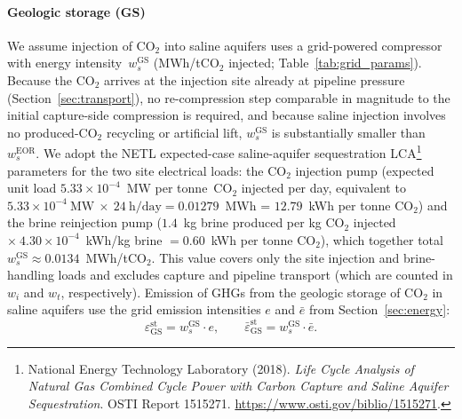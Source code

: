 \documentclass[11pt]{article}
\newcommand{\cotwo}{\ensuremath{\mathrm{CO_2}}}
\begin{document}
\paragraph{Geologic storage (GS)}
We assume injection of \cotwo{} into saline aquifers uses a grid-powered compressor with energy intensity~$w_s^{\text{GS}}$ (MWh/t\cotwo{} injected; Table~\ref{tab:grid_params}). Because the \cotwo{} arrives at the injection site already at pipeline pressure (Section~\ref{sec:transport}), no re-compression step comparable in magnitude to the initial capture-side compression is required, and because saline injection involves no produced-\cotwo{} recycling or artificial lift, $w_s^{\text{GS}}$ is substantially smaller than $w_s^{\text{EOR}}$. We adopt the NETL expected-case saline-aquifer sequestration LCA\footnote{National Energy Technology Laboratory (2018). \emph{Life Cycle Analysis of Natural Gas Combined Cycle Power with Carbon Capture and Saline Aquifer Sequestration}. OSTI Report 1515271. \url{https://www.osti.gov/biblio/1515271}.} parameters for the two site electrical loads: the CO$_2$ injection pump (expected unit load $5.33\times10^{-4}$~MW per tonne~\cotwo{} injected per day, equivalent to $5.33\times10^{-4}~\text{MW}~\times~24~\text{h/day} = 0.01279$~MWh = $12.79$~kWh per tonne \cotwo{}) and the brine reinjection pump ($1.4$~kg brine produced per kg \cotwo{} injected $\times~4.30\times10^{-4}$~kWh/kg brine $= 0.60$~kWh per tonne \cotwo{}), which together total $w_s^{\text{GS}} \approx 0.0134$~MWh/t\cotwo{}. This value covers only the site injection and brine-handling loads and excludes capture and pipeline transport (which are counted in $w_i$ and $w_t$, respectively).
Emission of GHGs from the geologic storage of \cotwo{} in saline aquifers use the grid emission intensities $e$ and $\bar{e}$ from Section~\ref{sec:energy}:
%
\begin{equation}
  \varepsilon_{\text{GS}}^{\text{st}} = w_s^{\text{GS}} \cdot e, \qquad
  \bar{\varepsilon}_{\text{GS}}^{\text{st}} = w_s^{\text{GS}} \cdot \bar{e}.
  \label{eq:storage_gs}
\end{equation}
\end{document}
